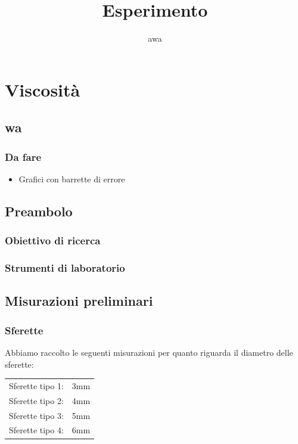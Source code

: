 \documentclass[a4paper,10pt]{report}
\author{awa}
\title{Esperimento}
\begin{document}
\maketitle
\setcounter{tocdepth}{3}
\tableofcontents

\chapter{Viscosità}
\section{wa}
\subsection{Da fare}
\begin{itemize}
 \item Grafici con barrette di errore
\end{itemize}

\section{Preambolo}
\subsection{Obiettivo di ricerca}
\subsection{Strumenti di laboratorio}

\section{Misurazioni preliminari}
\subsection{Sferette}
Abbiamo raccolto le seguenti misurazioni per quanto riguarda il diametro delle sferette:
\begin{center}
\begin{tabular}{|l|l|}
\toprule
 Sferette tipo 1: & 3mm\\
 Sferette tipo 2: & 4mm\\
 Sferette tipo 3: & 5mm\\
 Sferette tipo 4: & 6mm\\
\bottomrule
\end{tabular}
\end{center}
\end{document}
